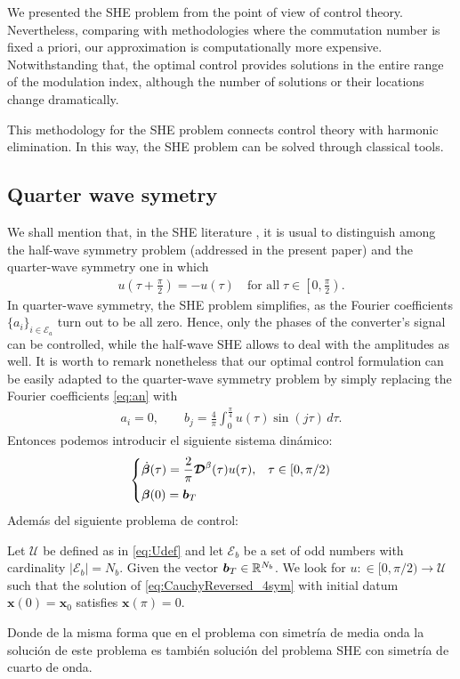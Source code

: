 \documentclass[twocolumn]{autart}    %
\begin{document}
We presented the SHE problem from the point of view of control theory. Nevertheless, comparing with methodologies where the commutation number is fixed a priori, our approximation is computationally more expensive. Notwithstanding that, the optimal control provides solutions in the entire range of the modulation index, although the number of solutions or their locations change dramatically.

This methodology for the SHE problem connects control theory with harmonic elimination. In this way, the SHE problem can be solved through classical tools.


\subsection{Quarter wave symetry}
We shall mention that, in the SHE literature \cite{Wu2009}, it is usual to distinguish among the half-wave symmetry problem (addressed in the present paper) and the quarter-wave symmetry one in which
    \begin{align*}
        u\left(\tau + \frac \pi2\right) = -u(\tau)\quad \mbox{for all}\; \tau \in \left[0,\frac \pi2\right).
    \end{align*}
    In quarter-wave symmetry, the SHE problem simplifies, as the Fourier coefficients $\{a_i\}_{i\in\mathcal E_a}$ turn out to be all zero. Hence, only the phases of the converter's signal can be controlled, while the half-wave SHE allows to deal with the amplitudes as well. It is worth to remark nonetheless that our optimal control formulation can be easily adapted to the quarter-wave symmetry problem by simply replacing the Fourier coefficients \eqref{eq:an} with
    \begin{align*}
        a_i = 0, \quad\quad b_j = \frac{4}{\pi} \int_0^{\frac \pi4} u(\tau)  \sin(j \tau)\,d\tau.
    \end{align*}
    Entonces podemos introducir el siguiente sistema dinámico:
    \begin{gather}
        \begin{cases}
            \displaystyle \dot{\bm{\beta}}(\tau) = \frac 2\pi \bm{\mathcal{D}}^\beta(\tau) u(\tau), & \tau \in [0,\pi/2)
            \\[6pt]
            \bm{\beta}(0) = \bm{b}_T
        \end{cases}\label{eq:CauchyReversed_4sym}
    \end{gather}
    Además del siguiente problema de control:
    \vspace{0.5em}
    \begin{problem}\label{pb:SHEpControl_4sym}
        Let $\mathcal{U}$ be defined as in \eqref{eq:Udef} and let $\mathcal{E} _b $ be a set of odd numbers with cardinality $ |\mathcal{E} _b| = N_b$. Given the vector $\bm{b}_T \in \mathbb{R}^{N_b} $. We look for $u:\in [0,\pi/2)\to\mathcal{U}$ such that the solution of \eqref{eq:CauchyReversed_4sym} with initial datum $\bm{x}(0)=\bm{x}_0$ satisfies $\bm{x}(\pi)=0$.
    \end{problem}
    Donde de la misma forma que en el problema con simetría de media onda la solución de este problema es también solución del problema SHE con simetría de cuarto de onda.
\end{document}
